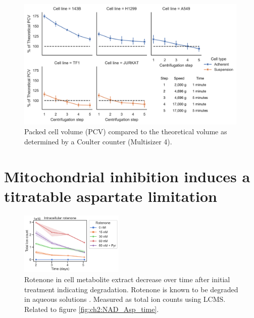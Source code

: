 \begin{figure}[ht]
    \centering
    \includegraphics[width=0.99\textwidth]{figures/chap2/app/CCvsPCV.pdf}
    \caption[Packed cell volume vs. Coulter counter.]{
    Packed cell volume (PCV) compared to the theoretical volume as determined by a Coulter counter (Multisizer 4).
    }
    \label{fig:app_ch2:CCvsPCV}
\end{figure}




\newpage
\section{Mitochondrial inhibition induces a titratable aspartate limitation}
\begin{figure}[ht!]
    \centering
    \includegraphics[width=0.44\textwidth]{figures/chap2/app/intra-rotenone-time_rep1.pdf}
    \caption[Rotenone concentration over time.]{
    Rotenone in cell metabolite extract decrease over time after initial treatment indicating degradation.
    Rotenone is known to be degraded in aqueous solutions \cite{Rohan2015-co}.
    Measured as total ion counts using LCMS.
    Related to figure \ref{fig:ch2:NAD_Asp_time}.
    }
    \label{fig:ch2:app:Rot_by_day}
\end{figure}

